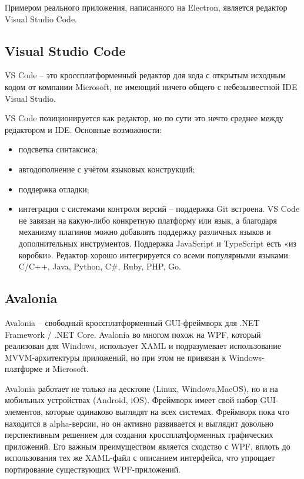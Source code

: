 \documentclass[10pt, a5paper]{article}
\begin{document}
Примером реального приложения, написанного на Electron, является редактор Visual Studio Code.

\subsection*{Visual Studio Code}

VS Code – это кроссплатформенный редактор для кода с открытым исходным кодом от компании Microsoft, не имеющий ничего общего с небезызвестной IDE Visual Studio.

VS Code позиционируется как редактор, но по сути это нечто среднее между редактором и IDE. Основные возможности:

\begin{itemize}
  \item подсветка синтаксиса;
  \item автодополнение с учётом языковых конструкций;
  \item поддержка отладки;
  \item интеграция с системами контроля версий – поддержка Git встроена.
VS Code не завязан на какую-либо конкретную платформу или язык, а благодаря механизму плагинов можно добавлять поддержку различных языков и дополнительных инструментов. Поддержка JavaScript и TypeScript есть «из коробки». Редактор хорошо интегрируется со всеми популярными языками: C/C++, Java, Python, C\#, Ruby, PHP, Go.
\end{itemize}

\subsection*{Avalonia}

Avalonia – свободный кроссплатформенный GUI-фреймворк для .NET Framework / .NET Core. Avalonia во многом похож на WPF, который реализован для Windows, использует XAML и подразумевает использование MVVM-архитектуры приложений, но при этом не привязан к Windows-платформе и Microsoft.

Avalonia работает не только на десктопе (Linux, Windows,\linebreak MacOS), но и на мобильных устройствах (Android, iOS). Фреймворк имеет свой набор GUI-элементов, которые одинаково выглядят на всех системах.
Фреймворк пока что находится в alpha-версии, но он активно развивается и выглядит довольно перспективным решением для создания кроссплатформенных графических приложений. Его важным преимуществом является сходство с WPF, вплоть до использования тех же XAML-файл с описанием интерфейса, что упрощает портирование существующих WPF-приложений.
\end{document}
